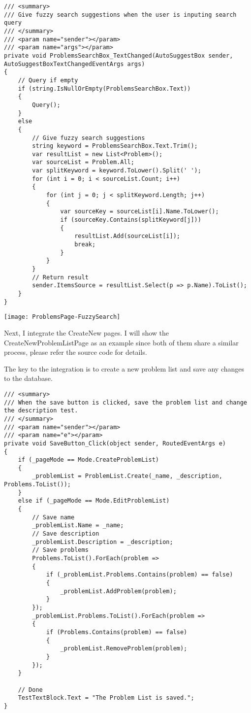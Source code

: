 \documentclass[report.tex]{subfiles}
\begin{document}
\begin{verbatim}
/// <summary>
/// Give fuzzy search suggestions when the user is inputing search query
/// </summary>
/// <param name="sender"></param>
/// <param name="args"></param>
private void ProblemsSearchBox_TextChanged(AutoSuggestBox sender, AutoSuggestBoxTextChangedEventArgs args)
{
    // Query if empty
    if (string.IsNullOrEmpty(ProblemsSearchBox.Text))
    {
        Query();
    }
    else
    {
        // Give fuzzy search suggestions
        string keyword = ProblemsSearchBox.Text.Trim();
        var resultList = new List<Problem>();
        var sourceList = Problem.All;
        var splitKeyword = keyword.ToLower().Split(' ');
        for (int i = 0; i < sourceList.Count; i++)
        {
            for (int j = 0; j < splitKeyword.Length; j++)
            {
                var sourceKey = sourceList[i].Name.ToLower();
                if (sourceKey.Contains(splitKeyword[j]))
                {
                    resultList.Add(sourceList[i]);
                    break;
                }
            }
        }
        // Return result
        sender.ItemsSource = resultList.Select(p => p.Name).ToList();
    }
}
\end{verbatim}

\texttt{[image: ProblemsPage-FuzzySearch]}

Next, I integrate the CreateNew pages. I will show the CreateNewProblemListPage as an example since both of them share a similar process, please refer the source code for details.

The key to the integration is to create a new problem list and save any changes to the database.

\begin{verbatim}
/// <summary>
/// When the save button is clicked, save the problem list and change the description test.
/// </summary>
/// <param name="sender"></param>
/// <param name="e"></param>
private void SaveButton_Click(object sender, RoutedEventArgs e)
{
    if (_pageMode == Mode.CreateProblemList)
    {
        _problemList = ProblemList.Create(_name, _description, Problems.ToList());
    }
    else if (_pageMode == Mode.EditProblemList)
    {
        // Save name
        _problemList.Name = _name;
        // Save description
        _problemList.Description = _description;
        // Save problems
        Problems.ToList().ForEach(problem =>
        {
            if (_problemList.Problems.Contains(problem) == false)
            {
                _problemList.AddProblem(problem);
            }
        });
        _problemList.Problems.ToList().ForEach(problem =>
        {
            if (Problems.Contains(problem) == false)
            {
                _problemList.RemoveProblem(problem);
            }
        });
    }

    // Done
    TestTextBlock.Text = "The Problem List is saved.";
}
\end{verbatim}
\end{document}
